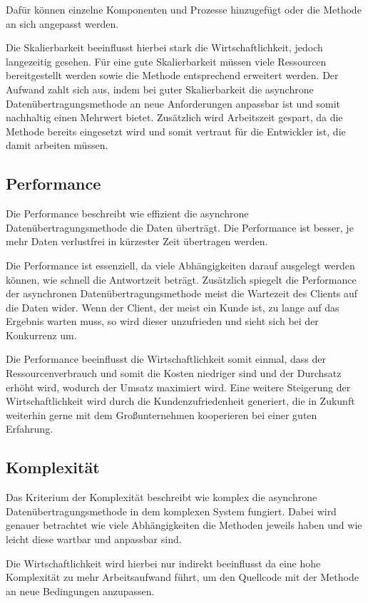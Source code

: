 Dafür können einzelne Komponenten und Prozesse hinzugefügt oder die Methode an sich angepasst werden. 

Die Skalierbarkeit beeinflusst hierbei stark die Wirtschaftlichkeit, jedoch langezeitig gesehen. Für eine gute Skalierbarkeit müssen viele Ressourcen bereitgestellt werden sowie die Methode entsprechend erweitert werden. Der Aufwand zahlt sich aus, indem bei guter Skalierbarkeit die asynchrone Datenübertragungsmethode an neue Anforderungen anpassbar ist und somit nachhaltig einen Mehrwert bietet. Zusätzlich wird Arbeitszeit gespart, da die Methode bereits eingesetzt wird und somit vertraut für die Entwickler ist, die damit arbeiten müssen.

\subsection{Performance}
Die Performance beschreibt wie effizient die asynchrone Datenübertragungsmethode die Daten überträgt. Die Performance ist besser, je mehr Daten verlustfrei in kürzester Zeit übertragen werden. 

Die Performance ist essenziell, da viele Abhängigkeiten darauf ausgelegt werden können, wie schnell die Antwortzeit beträgt. Zusätzlich spiegelt die Performance der asynchronen Datenübertragungsmethode meist die Wartezeit des Clients auf die Daten wider. Wenn der Client, der meist ein Kunde ist, zu lange auf das Ergebnis warten muss, so wird dieser unzufrieden und sieht sich bei der Konkurrenz um. 

Die Performance beeinflusst die Wirtschaftlichkeit somit einmal, dass der Ressourcenverbrauch und somit die Kosten niedriger sind und der Durchsatz erhöht wird, wodurch der Umsatz maximiert wird. Eine weitere Steigerung der Wirtschaftlichkeit wird durch die Kundenzufriedenheit generiert, die in Zukunft weiterhin gerne mit dem Großunternehmen kooperieren bei einer guten Erfahrung. 

\subsection{Komplexität}
Das Kriterium der Komplexität beschreibt wie komplex die asynchrone Datenübertragungsmethode in dem komplexen System fungiert. Dabei wird genauer betrachtet wie viele Abhängigkeiten die Methoden jeweils haben und wie leicht diese wartbar und anpassbar sind.

Die Wirtschaftlichkeit wird hierbei nur indirekt beeinflusst da eine hohe Komplexität zu mehr Arbeitsaufwand führt, um den Quellcode mit der Methode an neue Bedingungen anzupassen.


